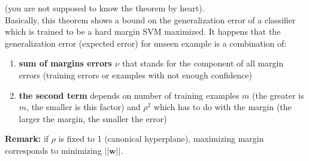 \noindent
(you are not supposed to know the theorem by heart).\\ Basically, this theorem shows
a bound on the generalization error of a classifier which is trained to be a hard
margin SVM maximized. It happens that the generalization error (expected error)
for unseen example is a combination of:
\begin{enumerate}
	\item \textbf{sum of margins errors $\nu$} that stands for the component of
		all margin errors (training errors or examples with not enough confidence)

	\item \textbf{the second term} depends on number of training examples $m$ (the
		greater is $m$, the smaller is this factor) and $\rho^{2}$ which has to do with
		the margin (the larger the margin, the smaller the error)
\end{enumerate}

\textbf{Remark:} if $\rho$ is fixed to 1 (canonical hyperplane), maximizing
margin corresponds to minimizing $||\pmb{w}||$.

